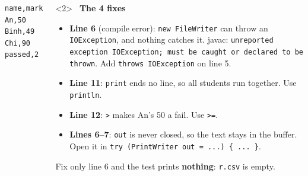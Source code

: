 \documentclass[aspectratio=169]{beamer}
\newcommand{\code}[1]{\texttt{#1}}
\newcommand{\goodlabel}[1]{\textcolor{goodgreen}{\ding{51}~\textbf{#1}}}
\begin{document}
\begin{frame}
\begin{columns}[T,onlytextwidth]
\begin{onlyenv}
\begin{lstlisting}[basicstyle=\ttfamily\fontsize{6.8}{7.9}\selectfont]
name,mark
An,50
Binh,49
Chi,90
passed,2
\end{lstlisting}
    \end{onlyenv}
    \begin{onlyenv}<2>
    \goodlabel{The 4 fixes}
    \begin{itemize}[itemsep=0.25em, leftmargin=1em]
      \footnotesize
      \item \textbf{Line 6} (compile error): \code{new FileWriter} can throw an
            \code{IOException}, and nothing catches it. javac:
            {\scriptsize\code{unreported exception IOException; must be caught or
            declared to be thrown}}. Add \code{throws IOException} on line 5.
      \item \textbf{Line 11}: \code{print} ends no line, so all students run
            together. Use \code{println}.
      \item \textbf{Line 12}: \code{>} makes An's 50 a fail. Use \code{>=}.
      \item \textbf{Lines 6--7}: \code{out} is never closed, so the text stays in
            the buffer. Open it in
            \code{try (PrintWriter out = ...) \{ ... \}}.
    \end{itemize}
    {\footnotesize Fix only line 6 and the test prints \textbf{nothing}: \code{r.csv}
    is empty.}
    \end{onlyenv}
  \end{columns}
\end{frame}
\end{document}
